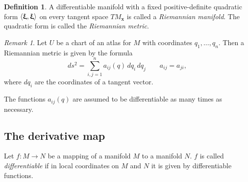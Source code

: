 \documentclass[leqno]{report}
\renewcommand{\pmb}[1]{{
  \renewcommand{\alpha}{\upalpha}
  \renewcommand{\beta}{\upbeta}
  \renewcommand{\gamma}{\upgamma}
  \renewcommand{\delta}{\updelta}
  \renewcommand{\epsilon}{\upepsilon}
  \renewcommand{\varepsilon}{\upvarepsilon}
  \renewcommand{\zeta}{\upzeta}
  \renewcommand{\eta}{\upeta}
  \renewcommand{\theta}{\uptheta}
  \renewcommand{\iota}{\upiota}
  \renewcommand{\kappa}{\upkappa}
  \renewcommand{\lambda}{\uplambda}
  \renewcommand{\mu}{\upmu}
  \renewcommand{\nu}{\upnu}
  \renewcommand{\xi}{\upxi}
  \renewcommand{\pi}{\uppi}
  \renewcommand{\rho}{\uprho}
  \renewcommand{\sigma}{\upsigma}
  \renewcommand{\tau}{\uptau}
  \renewcommand{\upsilon}{\upupsilon}
  \renewcommand{\varphi}{\upvarphi}
  \renewcommand{\phi}{\upphi}
  \renewcommand{\chi}{\upchi}
  \renewcommand{\psi}{\uppsi}
  \renewcommand{\omega}{\upomega}
  \boldsymbol{#1}
}}
\numberwithin{equation}{section}
\theoremstyle{plain}
\theoremstyle{definition}
\newtheorem*{defn*}{Definition}
\theoremstyle{remark}
\newtheorem*{rem*}{Remark}
\theoremstyle{smallcap}
\numberwithin{prob}{section}
\begin{document}
\begin{defn*}
  A differentiable manifold with a fixed positive-definite
  quadratic form $\langle \pmb\xi, \pmb\xi \rangle$
  on every tangent space $TM_\mathbf{x}$
  is called a \emph{Riemannian manifold}.
  The quadratic form is called the \emph{Riemannian metric}.
\end{defn*}

\begin{rem*}
  Let $U$ be a chart of an atlas for $M$ with coordinates
  $q_1, \dots, q_n$.
  Then a Riemannian metric is given by the formula
  $$
  ds^2 = \sum_{i,j=1}^n a_{ij}(q) \, dq_i \, dq_j
  \qquad
  a_{ij} = a_{ji},
  $$
  where $dq_i$ are the coordinates of a tangent vector.

  The functions $a_{ij}(q)$ are assumed to be
  differentiable as many times as necessary.
\end{rem*}


\subsection{The derivative map}

Let $f: M \to N$ be a mapping of a manifold $M$ to a manifold $N$.
%
$f$ is called \emph{differentiable} if in local coordinates on $M$ and $N$
it is given by differentiable functions.
\end{document}
